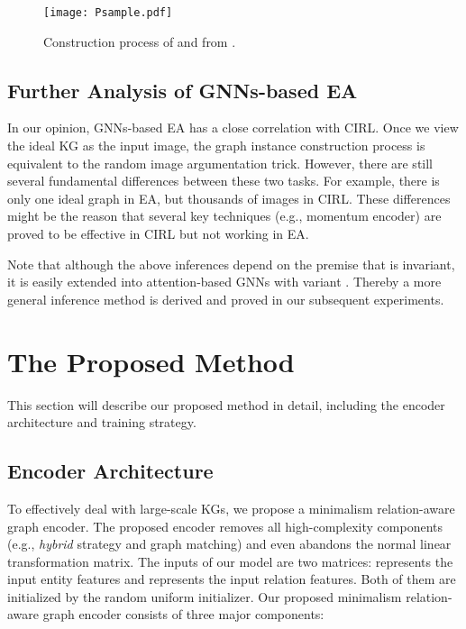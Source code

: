 \documentclass[sigconf]{acmart}
\begin{document}
\begin{figure}
  \centering
  \texttt{[image: Psample.pdf]}
  \caption{Construction process of  and  from .}\label{fig:psample}
\end{figure}

\vspace{-0.5em}
\subsection{Further Analysis of GNNs-based EA}
\label{sec:dis}
In our opinion, GNNs-based EA has a close correlation with CIRL.
Once we view the ideal KG as the input image, the graph instance construction process is equivalent to the random image argumentation trick.
However, there are still several fundamental differences between these two tasks. For example, there is only one ideal graph in EA, but thousands of images in CIRL.
These differences might be the reason that several key techniques (e.g., momentum encoder) are proved to be effective in CIRL but not working in EA.



Note that although the above inferences depend on the premise that  is invariant, it is easily extended into attention-based GNNs \cite{DBLP:conf/iclr/VelickovicCCRLB18,DBLP:conf/ijcai/WuLF0Y019,DBLP:conf/wsdm/MaoWXLW20} with variant . 
Thereby a more general inference method is derived and proved in our subsequent experiments.




\section{The Proposed Method}
\label{model}
This section will describe our proposed method in detail, including the encoder architecture and training strategy.

\subsection{Encoder Architecture}
To effectively deal with large-scale KGs, we propose a minimalism relation-aware graph encoder.
The proposed encoder removes all high-complexity components (e.g., \textit{hybrid}  strategy and graph matching) and even abandons the normal linear transformation matrix.
The inputs of our model are two matrices:  represents the input entity features and  represents the input relation features.
Both of them are initialized by the random uniform initializer.
Our proposed minimalism relation-aware graph encoder consists of three major components:
\end{document}
